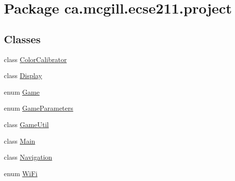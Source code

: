 \hypertarget{namespaceca_1_1mcgill_1_1ecse211_1_1project}{}\section{Package ca.\+mcgill.\+ecse211.\+project}
\label{namespaceca_1_1mcgill_1_1ecse211_1_1project}
\subsection*{Classes}
\begin{DoxyCompactItemize}
\item 
class \hyperlink{classca_1_1mcgill_1_1ecse211_1_1project_1_1_color_calibrator}{Color\+Calibrator}
\item 
class \hyperlink{classca_1_1mcgill_1_1ecse211_1_1project_1_1_display}{Display}
\item 
enum \hyperlink{enumca_1_1mcgill_1_1ecse211_1_1project_1_1_game}{Game}
\item 
enum \hyperlink{enumca_1_1mcgill_1_1ecse211_1_1project_1_1_game_parameters}{Game\+Parameters}
\item 
class \hyperlink{classca_1_1mcgill_1_1ecse211_1_1project_1_1_game_util}{Game\+Util}
\item 
class \hyperlink{classca_1_1mcgill_1_1ecse211_1_1project_1_1_main}{Main}
\item 
class \hyperlink{classca_1_1mcgill_1_1ecse211_1_1project_1_1_navigation}{Navigation}
\item 
enum \hyperlink{enumca_1_1mcgill_1_1ecse211_1_1project_1_1_wi_fi}{Wi\+Fi}
\end{DoxyCompactItemize}
